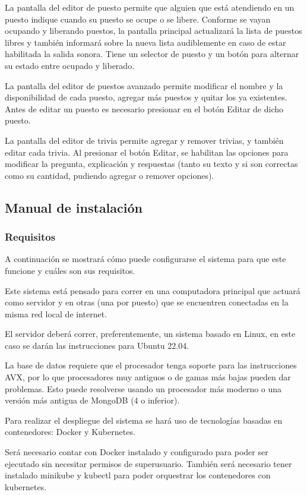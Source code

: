 \documentclass{article}
\begin{document}
La pantalla del editor de puesto permite que alguien que está atendiendo en un puesto indique cuando su puesto se ocupe o se libere. Conforme se vayan ocupando y liberando puestos, la pantalla principal actualizará la lista de puestos libres y también informará sobre la nueva lista audiblemente en caso de estar habilitada la salida sonora. Tiene un selector de puesto y un botón para alternar su estado entre ocupado y liberado.

La pantalla del editor de puestos avanzado permite modificar el nombre y la disponibilidad de cada puesto, agregar más puestos y quitar los ya existentes. Antes de editar un puesto es necesario presionar en el botón Editar de dicho puesto.

La pantalla del editor de trivia permite agregar y remover trivias, y también editar cada trivia. Al presionar el botón Editar, se habilitan las opciones para modificar la pregunta, explicación y respuestas (tanto su texto y si son correctas como su cantidad, pudiendo agregar o remover opciones).
\newpage
\subsection{Manual de instalación}
\subsubsection{Requisitos}
A continuación se mostrará cómo puede configurarse el sistema para que este funcione y cuáles son sus requisitos.

Este sistema está pensado para correr en una computadora principal que actuará como servidor y en otras (una por puesto) que se encuentren conectadas en la misma red local de internet.

El servidor deberá correr, preferentemente, un sistema basado en Linux, en este caso se darán las instrucciones para Ubuntu 22.04.

La base de datos requiere que el procesador tenga soporte para las instrucciones AVX, por lo que procesadores muy antiguos o de gamas más bajas pueden dar problemas. Esto puede resolverse usando un procesador más moderno o una versión más antigua de MongoDB (4 o inferior).

Para realizar el despliegue del sistema se hará uso de tecnologías basadas en contenedores: Docker y Kubernetes.

Será necesario contar con Docker instalado y configurado para poder ser ejecutado sin necesitar permisos de superusuario. También será necesario tener instalado minikube y kubectl para poder orquestrar los contenedores con kubernetes.
\end{document}
